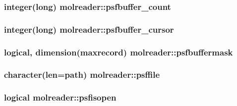 \hypertarget{classmolreader_af2dddaa7f6249a39287ffcdcbe2ce558}{
\subsubsection[{psfbuffer\-\_\-count}]{\setlength{\rightskip}{0pt plus 5cm}integer(long) molreader\-::psfbuffer\-\_\-count\hspace{0.3cm}{\ttfamily [private]}}}\label{classmolreader_af2dddaa7f6249a39287ffcdcbe2ce558}
\hypertarget{classmolreader_ab080c636a2423beb139bdd65dcd884c3}{
\subsubsection[{psfbuffer\-\_\-cursor}]{\setlength{\rightskip}{0pt plus 5cm}integer(long) molreader\-::psfbuffer\-\_\-cursor\hspace{0.3cm}{\ttfamily [private]}}}\label{classmolreader_ab080c636a2423beb139bdd65dcd884c3}
\hypertarget{classmolreader_a747bd2c32990916c313506c805317e88}{
\subsubsection[{psfbuffermask}]{\setlength{\rightskip}{0pt plus 5cm}logical, dimension({\bf maxrecord}) molreader\-::psfbuffermask\hspace{0.3cm}{\ttfamily [private]}}}\label{classmolreader_a747bd2c32990916c313506c805317e88}
\hypertarget{classmolreader_a48ac5c969e35417342bb66a57adec842}{
\subsubsection[{psffile}]{\setlength{\rightskip}{0pt plus 5cm}character(len=path) molreader\-::psffile\hspace{0.3cm}{\ttfamily [private]}}}\label{classmolreader_a48ac5c969e35417342bb66a57adec842}
\hypertarget{classmolreader_ae5cd9063d12a39b0e8266e184439c808}{
\subsubsection[{psfisopen}]{\setlength{\rightskip}{0pt plus 5cm}logical molreader\-::psfisopen\hspace{0.3cm}{\ttfamily [private]}}}\label{classmolreader_ae5cd9063d12a39b0e8266e184439c808}
